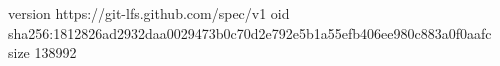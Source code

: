 version https://git-lfs.github.com/spec/v1
oid sha256:1812826ad2932daa0029473b0c70d2e792e5b1a55efb406ee980c883a0f0aafc
size 138992
